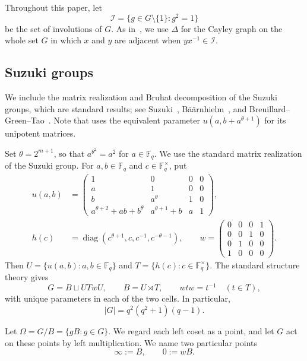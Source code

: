 \documentclass[11pt]{amsart}
\numberwithin{equation}{section}
\theoremstyle{definition}
\theoremstyle{remark}
\newcommand{\F}{\mathbb F}
\newcommand{\I}{\mathcal I}
\DeclareMathOperator{\diag}{diag}
\begin{document}
Throughout this paper, let
\[
 \I=\{g\in G\setminus\{1\}:g^2=1\}
\]
be the set of involutions of $G$. 
As in~\cite[Section~4.2]{HKK}, we use $\Delta$ for the Cayley graph on the whole set $G$ in which $x$ and $y$ are adjacent when $yx^{-1}\in\I$. 

\subsection{Suzuki groups}
We include the matrix realization and Bruhat decomposition of the Suzuki groups, which are standard results; see Suzuki~\cite{Suzuki}, B\"a\"arnhielm~\cite[Section~2.1.1]{Baarnhielm}, and Breuillard--Green--Tao~\cite[Definition~3.1]{BGT}.
Note that \cite{BGT} uses the equivalent parameter $u(a,b+a^{\theta+1})$ for its unipotent matrices.

Set $\theta=2^{m+1}$, so that $a^{\theta^2}=a^2$ for $a\in\F_q$.
We use the standard matrix realization of the Suzuki group. 
For $a,b\in\F_q$ and $c\in\F_q^\times$, put
\begin{align}
 u(a,b)&=
 \begin{pmatrix}
 1&0&0&0\\
 a&1&0&0\\
 b&a^\theta&1&0\\
 a^{\theta+2}+ab+b^\theta&a^{\theta+1}+b&a&1
 \end{pmatrix},\label{eq:u-matrix}\\
 h(c)&=\diag(c^{\theta+1},c,c^{-1},c^{-\theta-1}),
 \qquad
 w=\begin{pmatrix}
 0&0&0&1\\0&0&1&0\\0&1&0&0\\1&0&0&0
 \end{pmatrix}.
 \label{eq:h-w}
\end{align}
Then $U=\{u(a,b):a,b\in\F_q\}$ and $T=\{h(c):c\in\F_q^\times\}$.
The standard structure theory gives
\begin{equation}\label{eq:bruhat}
 G=B\sqcup UTwU,\qquad B=U\rtimes T,
 \qquad wtw=t^{-1}\quad(t\in T),
\end{equation}
with unique parameters in each of the two cells. 
In particular,
\begin{equation}\label{eq:order}
 |G|=q^2(q^2+1)(q-1).
\end{equation}

Let $\Omega=G/B=\{gB:g\in G\}$.
We regard each left coset as a point, and let $G$ act on these points by left multiplication. 
We name two particular points
\[
 \infty:=B,\qquad 0:=wB.
\]
\end{document}
